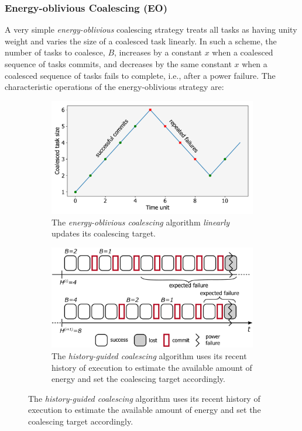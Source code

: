 \subsubsection{Energy-oblivious Coalescing (EO)}
\label{subsec:energyBlind}

A very simple {\em energy-oblivious} coalescing strategy treats all tasks as
having unity weight and varies the size of a coalesced task linearly. In such a
scheme, the number of tasks to coalesce, $B$, increases by a constant $x$ when
a coalesced sequence of tasks commits, and decreases by the same constant $x$
when a coalesced sequence of tasks fails to complete, i.e., after a power
failure. The characteristic operations of the energy-oblivious strategy are: 


\begin{figure}
    \centering
    \begin{subfigure}[b]{0.49\columnwidth}
        \includegraphics[width=\columnwidth]{figures/slowCoal}
		\caption{The {\em energy-oblivious coalescing} algorithm \emph{linearly} updates its coalescing target.}
		\label{fig:energyBlind}
    \end{subfigure}
    \begin{subfigure}[b]{0.49\columnwidth}
       	\includegraphics[width=\columnwidth]{figures/energy-aware-coal.pdf}
		\caption{The {\em history-guided coalescing} algorithm uses its recent history of execution to estimate the available amount of energy and set the coalescing target accordingly.}
		\label{fig:energyAware}
    \end{subfigure}
\end{figure}




